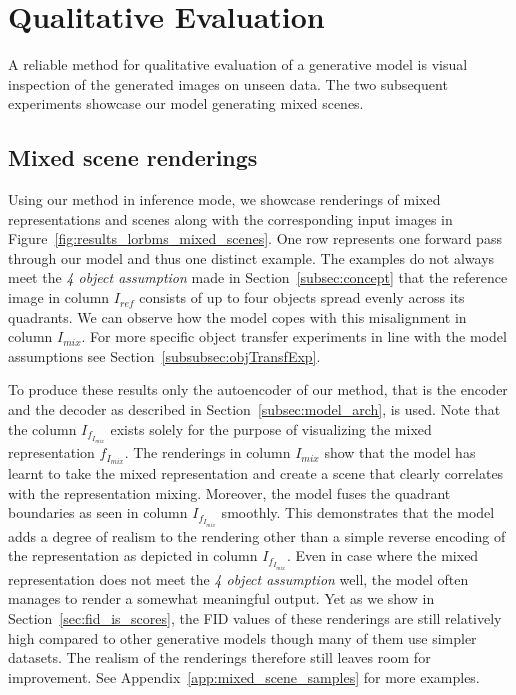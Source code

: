 \documentclass[a4paper,12pt]{report}
\begin{document}
\section{Qualitative Evaluation}\label{subsec:qual_eval}
A reliable method for qualitative evaluation of a generative model is visual inspection of the generated images on unseen data. The two subsequent experiments showcase our model generating mixed scenes.

\subsection{Mixed scene renderings}\label{sec:scene_renderings}
Using our method in inference mode, we showcase renderings of mixed representations and scenes along with the corresponding input images in Figure~\ref{fig:results_lorbms_mixed_scenes}. One row represents one forward pass through our model and thus one distinct example. The examples do not always meet the \textit{4 object assumption} made in Section~\ref{subsec:concept} that the reference image in column $I_{ref}$ consists of up to four objects spread evenly across its quadrants. We can observe how the model copes with this misalignment in column $I_{mix}$. For more specific object transfer experiments in line with the model assumptions see Section~\ref{subsubsec:objTransfExp}. 

To produce these results only the autoencoder of our method, that is the encoder and the decoder as described in Section~\ref{subsec:model_arch}, is used. Note that the column $I_{f_{I_{mix}}}$ exists solely for the purpose of visualizing the mixed representation $f_{I_{mix}}$. The renderings in column $I_{mix}$ show that the model has learnt to take the mixed representation and create a scene that clearly correlates with the representation mixing. Moreover, the model fuses the quadrant boundaries as seen in column $I_{f_{I_{mix}}}$ smoothly. This demonstrates that the model adds a degree of realism to the rendering other than a simple reverse encoding of the representation as depicted in column $I_{f_{I_{mix}}}$. Even in case where the mixed representation does not meet the \textit{4 object assumption} well, the model often manages to render a somewhat meaningful output. Yet as we show in Section~\ref{sec:fid_is_scores}, the FID values of these renderings are still relatively high compared to other generative models though many of them use simpler datasets. The realism of the renderings therefore still leaves room for improvement.
See Appendix~\ref{app:mixed_scene_samples} for more examples.
\end{document}
